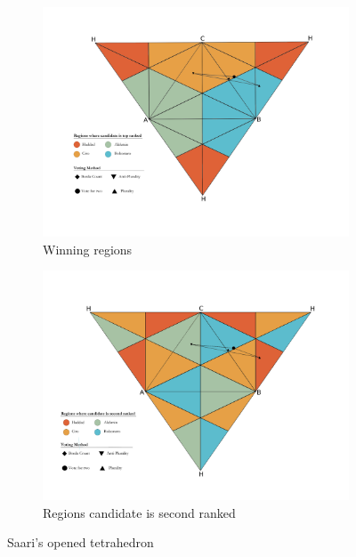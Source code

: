 \documentclass[hidelinks,11pt]{article} \usepackage[utf8]{inputenc}
\begin{document}
\begin{figure}[!h] \centering
  \begin{subfigure}[b]{0.80\textwidth} \centering
\includegraphics[width=\textwidth]{./images/top_ranked.png}
 \caption{Winning regions}
 \label{fig:ot_win}
\end{subfigure} \hfill
  \begin{subfigure}[b]{0.80\textwidth} \centering
\includegraphics[width=\textwidth]{./images/second_ranked.png}
 \caption{Regions candidate is second ranked}
 \label{fig:ot_second}
\end{subfigure}
\caption{Saari's opened tetrahedron}
\label{fig:ot}
\end{figure}
\end{document}
